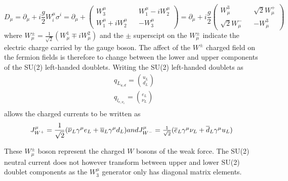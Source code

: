 \begin{equation}
  D_{\mu} = \partial_{\mu} + i\frac{g}{2}W^{\mu}_{i} \sigma^{i} = \partial_{\mu} + \begin{pmatrix} W^{\mu}_{3} && W^{\mu}_{1} - iW^{\mu}_{2}\\W^{\mu}_{1} + iW^{\mu}_{2} && -W^{\mu}_{3}\end{pmatrix} = \partial_{\mu} + i\frac{g}{2}\begin{pmatrix}W^{3}_{\mu} && \sqrt{2}W^{+}_{\mu}\\\sqrt{2}W^{-}_{\mu} && -W^{3}_{\mu}\end{pmatrix}
\end{equation}
where $W^{\pm}_{\mu} = \frac{1}{\sqrt{2}}(W^{1}_{\mu}\mp iW^{2}_{\mu})$ and the $\pm$ superscipt on the  $W^{\pm}_{\mu}$ indicate the electric charge carried by the gauge boson. The affect of the $W^{\pm}$ charged field on the fermion fields is therefore to change between the lower and upper components of the SU(2) left-handed doublets. Writing the SU(2) left-handed doublets as
\begin{equation}
  \begin{split}
    &q_{L_{u,d}} = \binom{u_{L}}{d_{L}}\\
    &q_{l_{e,\nu_{e}}} = \binom{e_{L}}{\nu_{L}}\\
    \end{split}
\end{equation}
 allows the charged currents to be written as
\begin{equation}
    J_{W^{+}}^{\mu} = \frac{1}{\sqrt{2}}(\overline{\nu}_{L}\gamma^{\mu}e_{L} + \overline{u}_{L}\gamma^{\mu}d_{L}) $$and$$ J_{W^{-}}^{\mu} = \frac{1}{\sqrt{2}}(\overline{e}_{L}\gamma^{\mu}\nu_{L} + \overline{d}_{L}\gamma^{\mu}u_{L})
    \label{eq:chargedcurr}
\end{equation}


These $W^{\pm}_{\mu}$ boson represent the charged $W$ bosons of the weak force.
The SU(2) neutral current does not however transform between upper and lower SU(2) doublet components as the $W^{\mu}_{3}$ generator only has diagonal matrix elements.











